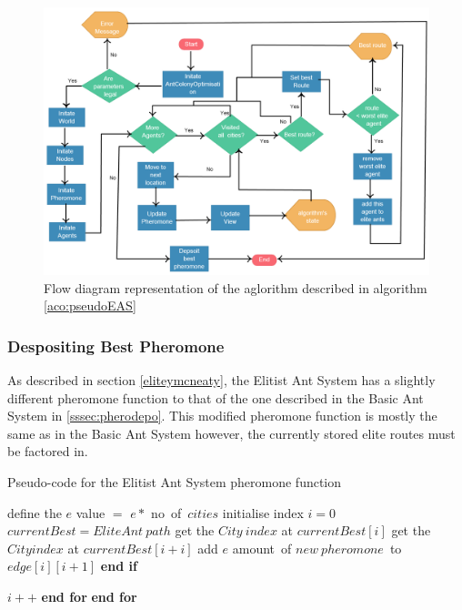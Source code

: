 \clearpage
\begin{figure}
\includegraphics[scale=0.38]{Images/chapter4/eliteAntFlow}
\caption{Flow diagram representation of the aglorithm described in algorithm \ref{aco:pseudoEAS}}
\label{fig:overallFlowEAS}
\end{figure}
\clearpage

\subsubsection{Despositing Best Pheromone}

As described in section \ref{eliteymcneaty}, the Elitist Ant System has a slightly different pheromone function to that of the one described in the Basic Ant System in \ref{sssec:pherodepo}. This modified pheromone function is mostly the same as in the Basic Ant System however, the currently stored elite routes must be factored in.

\begin{algorithm}[H]
\caption{Pseudo-code for the Elitist Ant System pheromone function}
\label{aco:pseudoEASphero}
\begin{algorithmic}[1]

\State define the $e$ value $=$ $e * $ no\ of\ $cities$
\State initialise index $i = 0$
\State $currentBest = EliteAnt\ path$ 
\State get the $City\ index$ at $currentBest[i]$
\State get the $City index$ at $currentBest[i+i]$
\State add $e$ amount\ of $new\ pheromone$\ to\ $edge[i][i + 1]$
\EndIf 
\State \textbf{end if}

\State $i++$
\EndFor 
\State \textbf{end for}
\EndFor
\State \textbf{end for}

\end{algorithmic}
\end{algorithm}

